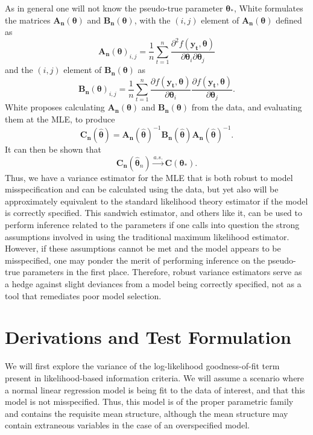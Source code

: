 \documentclass[submit]{smj}
\begin{document}
		As in general one will not know the pseudo-true parameter $\bm{\theta}_*$, White formulates the matrices $\bm{A_n}(\bm{\theta})$ and $\bm{B_n}(\bm{\theta})$, with the $(i,j)$ element of $\bm{A_n}(\bm{\theta})$ defined as
		\begin{equation*}
			\bm{A_n}(\bm{\theta})_{i,j} = \frac{1}{n} \sum_{t=1}^{n} \frac{\partial^2 f(\bm{y_t},\bm{\theta})}{\partial \bm{\theta}_i \partial \bm{\theta}_j}
		\end{equation*}
		and the $(i,j)$ element of $\bm{B_n}(\bm{\theta})$ as
		\begin{equation*}
			\bm{B_n}(\bm{\theta})_{i,j} = \frac{1}{n} \sum_{t=1}^{n} \frac{\partial f(\bm{y_t},\bm{\theta})}{\partial \bm{\theta}_i} \frac{\partial f(\bm{y_t},\bm{\theta})}{\partial \bm{\theta}_j} .
		\end{equation*}
		White proposes calculating $\bm{A_n}(\bm{\theta})$ and $\bm{B_n}(\bm{\theta})$ from the data, and evaluating them at the MLE, to produce
		\begin{equation*}
			\bm{C_n}(\hat{\bm{\theta}}) = \bm{A_n}(\hat{\bm{\theta}})^{-1} \bm{B_n}(\hat{\bm{\theta}}) \bm{A_n}(\hat{\bm{\theta}})^{-1} .
		\end{equation*}
		It can then be shown that 
		\begin{equation*}
			\bm{C_n}(\hat{\bm{\theta}}_n) \xrightarrow[]{a.s.} \bm{C}(\bm{\theta}_* ) .
		\end{equation*}
		Thus, we have a variance estimator for the MLE that is both robust to model misspecification and can be calculated using the data, but yet also will be approximately equivalent to the standard
		likelihood theory estimator if the model is correctly specified. This sandwich estimator, and others like it, can be used to perform inference related to the parameters if one calls into question
		the strong assumptions involved in using the traditional maximum likelihood estimator. However, if these assumptions cannot be met and the model appears to be misspecified, one may ponder
		the merit of performing inference on the pseudo-true parameters in the first place. Therefore, robust variance estimators serve as a hedge against slight deviances from a model
		being correctly specified, not as a tool that remediates poor model selection.

\section{Derivations and Test Formulation}
		
		We will first explore the variance of the log-likelihood goodness-of-fit term present in likelihood-based information criteria. We will assume a
		scenario where a normal linear regression model is being fit to the data of interest, and that this model is not misspecified. Thus, this model is of the proper
		parametric family and contains the requisite mean structure, although the mean structure may contain extraneous variables in the
		case of an overspecified model.
\end{document}

